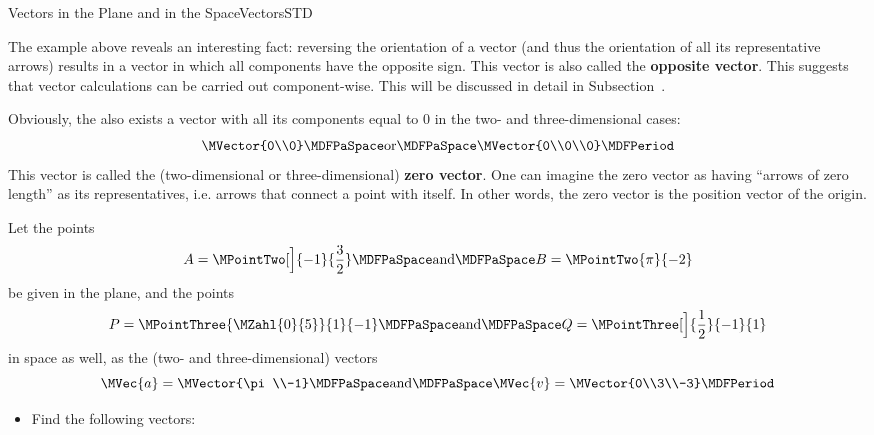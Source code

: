 \begin{MXContent}{Vectors in the Plane and in the Space}{Vectors}{STD}
\begin{MExample}
\end{MExample}

The example above reveals an interesting fact: reversing the orientation of a vector (and thus the 
orientation of all its representative arrows) results in a vector in which all components have the opposite sign. 
This vector is also called the \textbf{opposite vector}. This suggests that vector calculations can be carried out 
component-wise. This will be discussed in detail in Subsection~.  

Obviously, the also exists a vector with all its components equal to $0$ in the two- and three-dimensional cases:
\[
 \MVector{0\\0}\MDFPaSpace\textrm{or}\MDFPaSpace\MVector{0\\0\\0}\MDFPeriod
\]
This vector is called the (two-dimensional or three-dimensional) \textbf{zero vector}. One can imagine the zero vector 
as having ``arrows of zero length'' as its representatives, i.e. arrows that connect a point with itself. In other words, the zero vector is the position vector of the origin.

\begin{MExercise}
Let the points
\[
 A=\MPointTwo[\Big]{-1}{\frac{3}{2}}\MDFPaSpace\textrm{and}\MDFPaSpace B=\MPointTwo{\pi}{-2}
\]
be given in the plane, and the points
\[
 P=\MPointThree{\MZahl{0}{5}}{1}{-1}\MDFPaSpace\textrm{and}\MDFPaSpace Q=\MPointThree[\Big]{\frac{1}{2}}{-1}{1}
\]
in space as well, as the (two- and three-dimensional) vectors
\[
 \MVec{a}=\MVector{\pi\\-1}\MDFPaSpace\textrm{and}\MDFPaSpace \MVec{v}=\MVector{0\\3\\-3} \MDFPeriod
\]
\begin{itemize}
 \item Find the following vectors:\\


\end{itemize}
\end{MExercise}
\end{MXContent}
